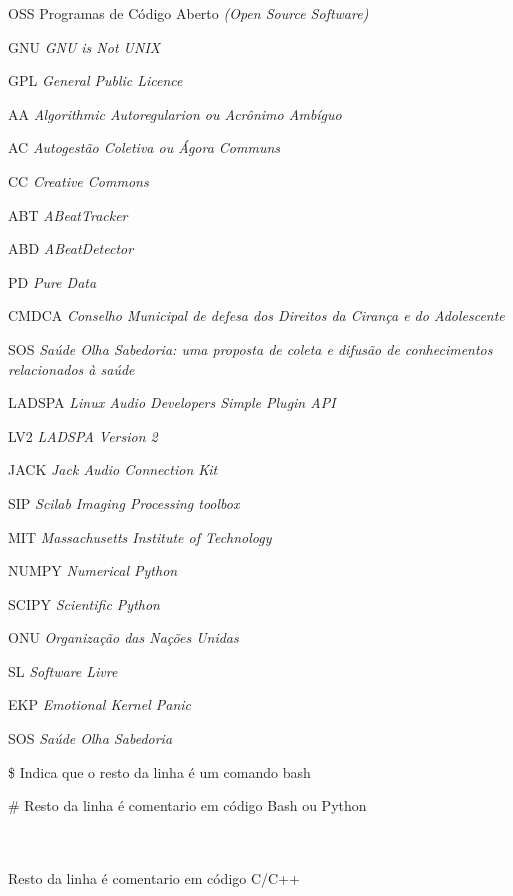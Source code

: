 \resumoeabstract %

\listadefiguras %

\listadetabelas %

	\begin{listaespecial}[BIGNAMEWIDTH]
		\item[OSS] Programas de Código Aberto \emph{(Open Source Software)}
		\item[GNU] \emph{GNU is Not UNIX}
		\item[GPL] \emph{General Public Licence}
                \item[AA] \emph{Algorithmic Autoregularion ou Acrônimo Ambíguo}
                \item[AC] \emph{Autogestão Coletiva ou Ágora Communs}
                \item[CC] \emph{Creative Commons}
                \item[ABT] \emph{ABeatTracker}
                \item[ABD] \emph{ABeatDetector}
                \item[PD] \emph{Pure Data}
                \item[CMDCA] \emph{Conselho Municipal de defesa dos Direitos da Cirança e do Adolescente}
                \item[SOS] \emph{Saúde Olha Sabedoria: uma proposta de coleta e difusão de conhecimentos relacionados à saúde}
                \item[LADSPA] \emph{Linux Audio Developers Simple Plugin API}
                \item[LV2] \emph{LADSPA Version 2}
                \item[JACK] \emph{Jack Audio Connection Kit}
                \item[SIP] \emph{Scilab Imaging Processing toolbox}
                \item[MIT] \emph{Massachusetts Institute of Technology}
                \item[NUMPY] \emph{Numerical Python}
                \item[SCIPY] \emph{Scientific Python}
                \item[ONU] \emph{Organização das Nações Unidas}
                \item[SL] \emph{Software Livre}
                \item[EKP] \emph{Emotional Kernel Panic}
                \item[SOS] \emph{Saúde Olha Sabedoria}
	\end{listaespecial} 

	\begin{listaespecial}[BIGNAMEWIDTH]
		\item[\$] Indica que o resto da linha é um comando bash
		\item[\#] Resto da linha é comentario em código Bash ou Python
		\item[\\\\] Resto da linha é comentario em código C/C++
	\end{listaespecial} 

\sumario

